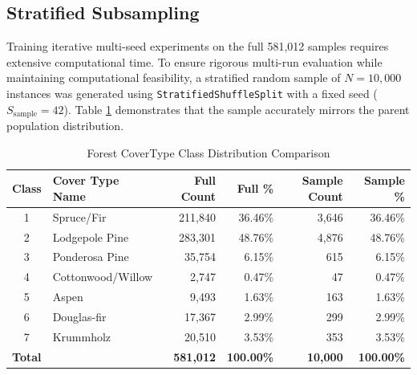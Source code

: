 \subsection{Stratified Subsampling}
Training iterative multi-seed experiments on the full 581,012 samples requires extensive computational time. To ensure rigorous multi-run evaluation while maintaining computational feasibility, a stratified random sample of $N = 10,000$ instances was generated using \texttt{StratifiedShuffleSplit} with a fixed seed ($S_{\text{sample}} = 42$). Table \ref{tab:class_distribution} demonstrates that the sample accurately mirrors the parent population distribution.

\begin{table}[H]
\centering
\caption{Forest CoverType Class Distribution Comparison}
\label{tab:class_distribution}
\begin{tabular}{clrrrr}
\toprule
\textbf{Class} & \textbf{Cover Type Name} & \textbf{Full Count} & \textbf{Full \%} & \textbf{Sample Count} & \textbf{Sample \%} \\
\midrule
1 & Spruce/Fir & 211,840 & 36.46\% & 3,646 & 36.46\% \\
2 & Lodgepole Pine & 283,301 & 48.76\% & 4,876 & 48.76\% \\
3 & Ponderosa Pine & 35,754 & 6.15\% & 615 & 6.15\% \\
4 & Cottonwood/Willow & 2,747 & 0.47\% & 47 & 0.47\% \\
5 & Aspen & 9,493 & 1.63\% & 163 & 1.63\% \\
6 & Douglas-fir & 17,367 & 2.99\% & 299 & 2.99\% \\
7 & Krummholz & 20,510 & 3.53\% & 353 & 3.53\% \\
\midrule
\textbf{Total} & & \textbf{581,012} & \textbf{100.00\%} & \textbf{10,000} & \textbf{100.00\%} \\
\bottomrule
\end{tabular}
\end{table}

